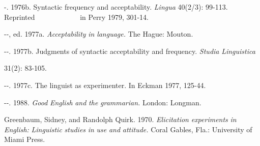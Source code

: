 \begin{listWWNumviiileveli}
\item 
\begin{styleStandard}
{}-. 1976b. Syntactic frequency and acceptability. \textit{Lingua}\textit{ }40(2/3): 99-113. Reprinted \ \ \ \ \ \ \ \ \ \ \ \ in Perry 1979, 301-14.
\end{styleStandard}


\begin{listWWNumviiilevelii}
\item 
\begin{styleStandard}
{}-{}-, ed. 1977a. \textit{Acceptability}\textit{ }\textit{in}\textit{ }\textit{language.}\textit{ }The Hague: Mouton.
\end{styleStandard}


\item 
\begin{styleStandard}
{}-{}-. 1977b. Judgments of syntactic acceptability and frequency. \textit{Studia}\textit{ }\textit{Linguistica}
\end{styleStandard}


\end{listWWNumviiilevelii}
\end{listWWNumviiileveli}
\begin{styleStandard}
31(2): 83-105.
\end{styleStandard}


\begin{listWWNumviiileveli}
\item 
\begin{listWWNumviiilevelii}
\item 
\begin{styleStandard}
{}-{}-. 1977c. The linguist as experimenter. In Eckman 1977, 125-44.
\end{styleStandard}


\item 
\begin{styleStandard}
{}-{}-. 1988. \textit{Good}\textit{ }\textit{English}\textit{ }\textit{and}\textit{ }\textit{the}\textit{ }\textit{grammarian.}\textit{ }London: Longman.
\end{styleStandard}


\end{listWWNumviiilevelii}
\end{listWWNumviiileveli}
\begin{styleStandard}
Greenbaum, Sidney, and Randolph Quirk. 1970. \textit{Elicitation}\textit{ }\textit{experiments}\textit{ }\textit{in}\textit{ }\textit{English:}\textit{ }\textit{Linguistic}\textit{ }\textit{studies}\textit{ }\textit{in}\textit{ }\textit{use}\textit{ }\textit{and}\textit{ }\textit{attitude.}\textit{ }Coral Gables, Fla.: University of Miami Press.
\end{styleStandard}


